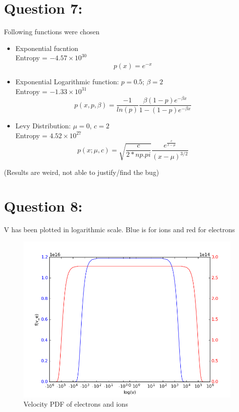 \documentclass[11pt, a4paper]{article}
\begin{document}
\section{Question 7:}
Following functions were chosen
\begin{itemize}
 \item Exponential fucntion \\
  Entropy = $-4.57 \times 10^30$
 \begin{equation}
  p(x) = e^{-x}
 \end{equation}
 \item Exponential Logarithmic function: $p  = 0.5$; $\beta = 2$\\
  Entropy = $-1.33 \times 10^31$
 \begin{equation}
  p(x, p, \beta) = \frac{-1}{ln(p)} \frac{\beta (1-p)e^{-\beta x}}{1 - (1-p)e^{-\beta x}}
 \end{equation}
 \item Levy Distribution: $\mu = 0$, $c = 2$ \\
 Entropy = $4.52 \times 10^27$
 \begin{equation}
  p(x;\mu, c) = \sqrt{\frac{c}{2*np.pi}}\frac{e^{\frac{c}{x - \mu}}}{(x - \mu)^{3/2}}
 \end{equation}
\end{itemize}
(Results are weird, not able to justify/find the bug)

\section{Question 8:}
V has been plotted in logarithmic scale. Blue is for ions and red for electrons
\begin{figure}[H]
 \centering
 \includegraphics[scale = 0.5]{Plasma_vel.png}
 \caption{Velocity PDF of electrons and ions}
 \label{fig:plasma_v}
\end{figure}
\end{document}
